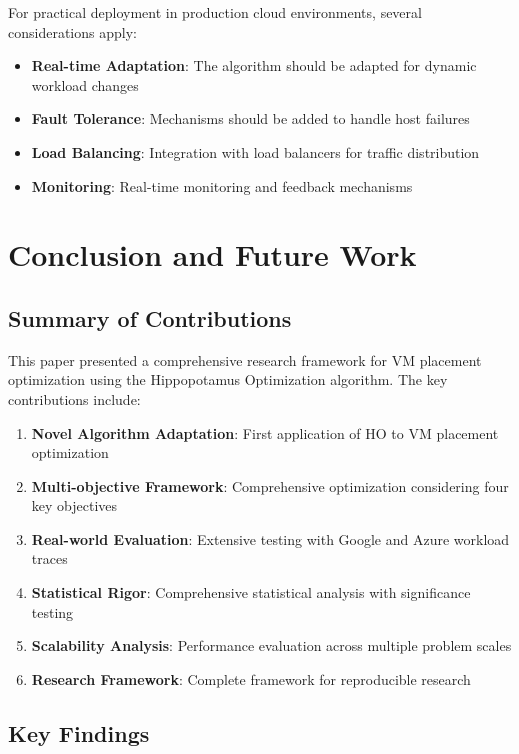 \documentclass[conference]{IEEEtran}
\begin{document}
For practical deployment in production cloud environments, several considerations apply:
\begin{itemize}
    \item \textbf{Real-time Adaptation}: The algorithm should be adapted for dynamic workload changes
    \item \textbf{Fault Tolerance}: Mechanisms should be added to handle host failures
    \item \textbf{Load Balancing}: Integration with load balancers for traffic distribution
    \item \textbf{Monitoring}: Real-time monitoring and feedback mechanisms
\end{itemize}

\section{Conclusion and Future Work}

\subsection{Summary of Contributions}

This paper presented a comprehensive research framework for VM placement optimization using the Hippopotamus Optimization algorithm. The key contributions include:

\begin{enumerate}
    \item \textbf{Novel Algorithm Adaptation}: First application of HO to VM placement optimization
    \item \textbf{Multi-objective Framework}: Comprehensive optimization considering four key objectives
    \item \textbf{Real-world Evaluation}: Extensive testing with Google and Azure workload traces
    \item \textbf{Statistical Rigor}: Comprehensive statistical analysis with significance testing
    \item \textbf{Scalability Analysis}: Performance evaluation across multiple problem scales
    \item \textbf{Research Framework}: Complete framework for reproducible research
\end{enumerate}

\subsection{Key Findings}
\end{document}
